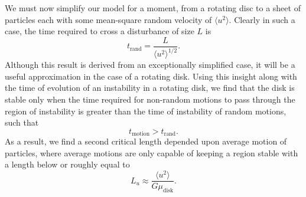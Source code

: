 \documentclass[aps,pra,twocolumn]{revtex4-1}
\begin{document}
We must now simplify our model for a moment, from a rotating disc to a sheet of particles each with some mean-square random velocity of $\langle u^2 \rangle$. Clearly in such a case, the time required to cross a disturbance of size $L$ is
\begin{equation}
t_\text{rand} = \frac{L}{\langle u^2 \rangle^{1/2}}.
\end{equation}
Although this result is derived from an exceptionally simplified case, it will be a useful approximation in the case of a rotating disk.  Using this insight along with the time of evolution of an instability in a rotating disk, we find that the disk is stable only when the time required for non-random motions to pass through the region of instability is greater than the time of instability of random motions, such that
\begin{equation}
t_\text{motion} > t_\text{rand}.
\end{equation}
As a result, we find a second critical length depended upon average motion of particles, where average motions are only capable of keeping a region stable with a length below or roughly equal to
\begin{equation}
L_u \approx \frac{\langle u^2 \rangle}{G\mu_\text{disk}}. \label{crit2.1}
\end{equation}
\end{document}
